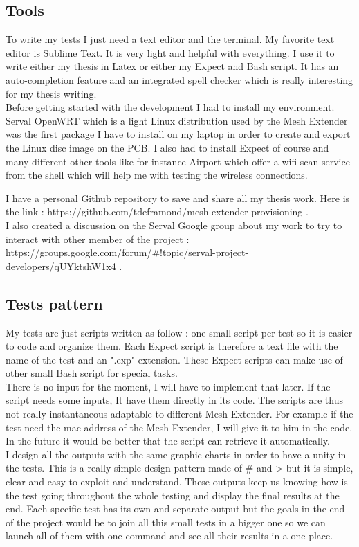 \subsection{Tools}
To write my tests I just need a text editor and the terminal. My favorite text editor is Sublime Text. It is very light and helpful with everything. I use it to write either my thesis in Latex or either my Expect and Bash script. It has an auto-completion feature and an integrated spell checker which is really interesting for my thesis writing. 
\\
Before getting started with the development I had to install my environment. Serval OpenWRT which is a light Linux distribution used by the Mesh Extender was the first package I have to install on my laptop in order to create and export the Linux disc image on the PCB. I also had to install Expect of course and many different other tools like for instance Airport which offer a wifi scan service from the shell which will help me with testing the wireless connections.
\par
I have a personal Github repository to save and share all my thesis work. Here is the link : https://github.com/tdeframond/mesh-extender-provisioning .
\\
I also created a discussion on the Serval Google group about my work to try to interact with other member of the project : https://groups.google.com/forum/#!topic/serval-project-developers/qUYktshW1x4 . 

\subsection{Tests pattern}
My tests are just scripts written as follow : one small script per test so it is easier to code and organize them. Each Expect script is therefore a text file with the name of the test and an 
".exp" extension. These Expect scripts can make use of other small Bash script for special tasks. 
\\
There is no input for the moment, I will have to implement that later. If the script needs some inputs, It have them directly in its code. The scripts are thus not really instantaneous adaptable to different Mesh Extender. For example if the test need the mac address of the Mesh Extender, I will give it to him in the code. In the future it would be better that the script can retrieve it automatically.
\\
I design all the outputs with the same graphic charts in order to have a unity in the tests. This is a really simple design pattern made of # and > but it is simple, clear and easy to exploit and understand. These outputs keep us knowing how is the test going throughout the whole testing and display the final results at the end. Each specific test has its own and separate output but the goals in the end of the project would be to join all this small tests in a bigger one so we can launch all of them with one command and see all their results in a one place. 
